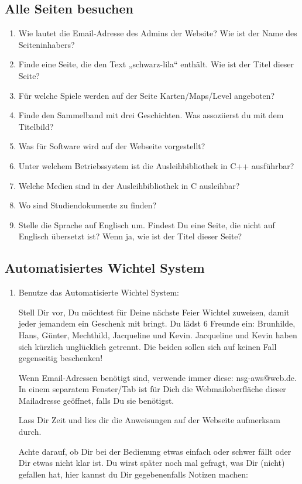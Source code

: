 \subsection{Alle Seiten besuchen}
\begin{enumerate}
\item Wie lautet die Email-Adresse des Admins der Website? Wie ist der Name des Seiteninhabers?
\interviewText{\interviewTextS}
\item Finde eine Seite, die den Text „schwarz-lila“ enthält. Wie ist der Titel dieser Seite?
\interviewText{\interviewTextS}
\item Für welche Spiele werden auf der Seite Karten/Maps/Level angeboten?
\interviewText{\interviewTextS}
\item Finde den Sammelband mit drei Geschichten. Was assoziierst du mit dem Titelbild?
\interviewText{\interviewTextS}
\item Was für Software wird auf der Webseite vorgestellt?
\interviewText{\interviewTextS}
\item Unter welchem Betriebssystem ist die Ausleihbibliothek in C++ ausführbar?
\interviewText{\interviewTextS}
\item Welche Medien sind in der Ausleihbibliothek in C ausleihbar?
\interviewText{\interviewTextS}
\item Wo sind Studiendokumente zu finden?
\interviewText{\interviewTextS}
\item Stelle die Sprache auf Englisch um. Findest Du eine Seite, die nicht auf Englisch übersetzt ist? Wenn ja, wie ist der Titel dieser Seite?
\interviewText{\interviewTextS}
\end{enumerate}

\clearpage
\subsection{Automatisiertes Wichtel System}
\begin{enumerate}
\item Benutze das Automatisierte Wichtel System:

Stell Dir vor, Du möchtest für Deine nächste Feier Wichtel zuweisen, damit jeder jemandem ein Geschenk mit bringt. Du lädst 6 Freunde ein: Brunhilde, Hans, Günter, Mechthild, Jacqueline und Kevin. Jacqueline und Kevin haben sich kürzlich unglücklich getrennt. Die beiden sollen sich auf keinen Fall gegenseitig beschenken!

Wenn Email-Adressen benötigt sind, verwende immer diese: nsg-aws@web.de. In einem separatem Fenster/Tab ist für Dich die Webmailoberfläche dieser Mailadresse geöffnet, falls Du sie benötigst.

Lass Dir Zeit und lies dir die Anweisungen auf der Webseite aufmerksam durch.

Achte darauf, ob Dir bei der Bedienung etwas einfach oder schwer fällt oder Dir etwas nicht klar ist. Du wirst später noch mal gefragt, was Dir (nicht) gefallen hat, hier kannst du Dir gegebenenfalls Notizen machen:
\interviewText{\interviewTextL}
\end{enumerate}

